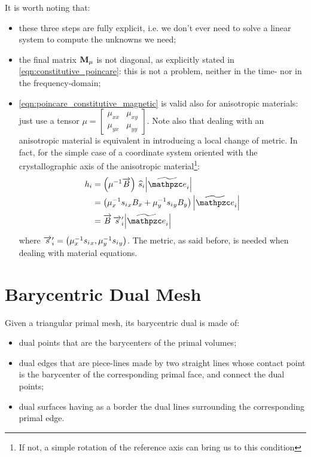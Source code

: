 It is worth noting that:
\begin{itemize}
\item
  these three steps are fully explicit, i.e. we
  don't ever need to solve a linear system to compute the unknowns we
  need;
\item
  the final matrix $\mathbf{M}_\mu$ is not diagonal, as
  explicitly stated in \eqref{eqn:constitutive_poincare}: this is not
  a problem, neither in the time- nor in the frequency-domain;
\item
  \eqref{eqn:poincare_constitutive_magnetic} is valid also for
  anisotropic materials: just use a tensor $\mu = \left[
  \begin{smallmatrix} \mu_{xx} & \mu_{xy} \\ \mu_{yx} & \mu_{yy}
  \end{smallmatrix} \right]$. Note also that dealing with an
  anisotropic material is equivalent in introducing a local change of
  metric. In fact, for the simple case of a coordinate system oriented
  with the crystallographic axis of the anisotropic
  material\footnote{If not, a simple rotation of the reference axis
  can bring us to this condition}:
  \begin{equation*} \begin{split}
    h_i & = \Prod{\left( \mu^{-1} \B \right)}{\Versor{s}_i} \Measure{\DualLine{e}_i} \\
        & = \left( \mu_x^{-1} {s_i}_x B_x + \mu_y^{-1} {s_i}_y B_y \right) \Measure{\DualLine{e}_i} \\
        & = \Prod{\B}{\Vector{s}'_i} \Measure{\DualLine{e}_i}
  \end{split} \end{equation*}
  where $\overrightarrow{s}'_i = \left( \mu_x^{-1} {s_i}_x, \mu_y^{-1}
  {s_i}_y \right)$. The metric, as said before, is needed when dealing
  with material equations.
\end{itemize}


\section{Barycentric Dual Mesh}  \label{sec:barycentric}

Given a triangular primal mesh, its barycentric dual is made of:
\begin{itemize}
\item
  dual points that are the barycenters of the primal volumes;
\item
  dual edges that are piece-lines made by two straight lines whose
  contact point is the barycenter of the corresponding primal face,
  and connect the dual points;
\item
  dual surfaces having as a border the dual lines surrounding the
  corresponding primal edge.
\end{itemize}

